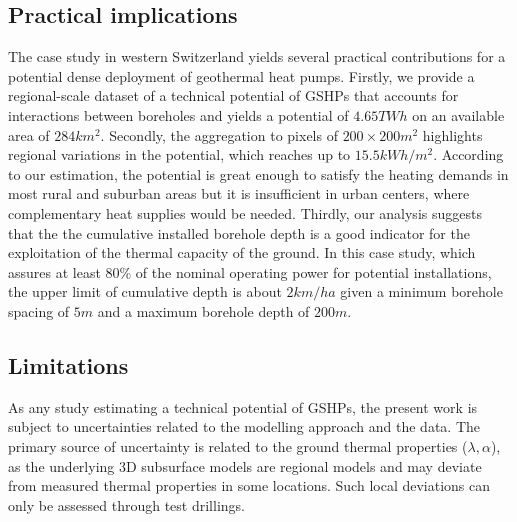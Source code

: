 
\subsection{Practical implications}

The case study in western Switzerland yields several practical contributions for a potential dense deployment of geothermal heat pumps. 
Firstly, we provide a regional-scale dataset of a technical potential of GSHPs
that accounts for interactions between boreholes and yields a potential of $4.65TWh$ on an available area of $284 km^2$.
Secondly, the aggregation to pixels of $200 \times 200 m^2$ highlights regional variations in the potential, which reaches up to $15.5 kWh/m^2$. 
According to our estimation, the potential is great enough to satisfy the heating demands in most rural and suburban areas but it is insufficient in urban centers, where complementary heat supplies would be needed.
Thirdly, our analysis suggests that the the cumulative installed borehole depth is a good indicator for the exploitation of the thermal capacity of the ground. 
In this case study, which assures at least 80\% of the nominal operating power for potential installations, the upper limit of cumulative depth is about $2km/ha$ given a minimum borehole spacing of $5m$ and a maximum borehole depth of $200m$. 

\subsection{Limitations}
\label{limitations_BHE}

As any study estimating a technical potential of GSHPs, the present work is subject to uncertainties related to the modelling approach and the data. 
The primary source of uncertainty is related to the ground thermal properties ($\lambda,\alpha$), as the underlying 3D subsurface models are regional models and may deviate from measured thermal properties in some locations. 
Such local deviations can only be assessed through test drillings.

